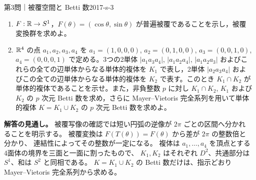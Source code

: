 \begin{problem}{第3問｜被覆空間と Betti 数}{2017-s-3}
\begin{enumerate}
  \item[(1)] $F:\mathbb{R}\to S^1$，$F(\theta)=(\cos\theta,\sin\theta)$ が普遍被覆であることを示し，被覆変換群を求めよ。
  \item[(2)] $\mathbb{R}^4$ の点 $a_1,a_2,a_3,a_4$ を $a_1=(1,0,0,0)$, $a_2=(0,1,0,0)$, $a_3=(0,0,1,0)$, $a_4=(0,0,0,1)$ で定める。3つの2単体 $|a_1a_3a_4|$, $|a_1a_2a_4|$, $|a_1a_2a_3|$ およびこれらの全ての辺単体からなる単体的複体を $K_1$ で表し，2単体 $|a_2a_3a_4|$ およびこの全ての辺単体からなる単体的複体を $K_2$ で表す。このとき $K_1\cap K_2$ が単体的複体であることを示せ。また，非負整数 $p$ に対し $K_1\cap K_2$, $K_1$ および $K_2$ の $p$ 次元 Betti 数を求め，さらに Mayer--Vietoris 完全系列を用いて単体的複体 $K=K_1\cup K_2$ の $p$ 次元 Betti 数を求めよ。
\end{enumerate}
\end{problem}
\begin{memo*}
\textbf{解答の見通し。}
被覆写像の確認では短い円弧の逆像が $2\pi$ ごとの区間へ分かれることを明示する。
被覆変換は $F(T(\theta))=F(\theta)$ から差が $2\pi$ の整数倍と分かり、
連結性によってその整数が一定になる。
複体は $a_1,\ldots,a_4$ を頂点とする4面体の境界を三面と一面に割ったもので、
$K_1,K_2$ はそれぞれ $D^2$、共通部分は $S^1$、和は $S^2$ と同相である。
$K=K_1\cup K_2$ の Betti 数だけは、指示どおり Mayer--Vietoris 完全系列から求める。
\end{memo*}
